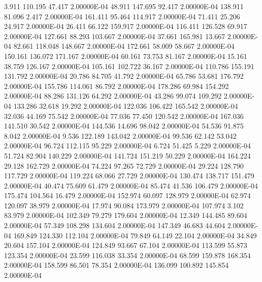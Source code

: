      3.911   110.195    47.417  2.00000E-04
    48.911   147.695    92.417  2.00000E-04
   138.911    81.096     2.417  2.00000E-04
   161.411    95.464   114.917  2.00000E-04
    71.411    25.206    24.917  2.00000E-04
    26.411    66.122   159.917  2.00000E-04
   116.411   126.528    69.917  2.00000E-04
   127.661    88.293   103.667  2.00000E-04
    37.661   165.981    13.667  2.00000E-04
    82.661   118.048   148.667  2.00000E-04
   172.661    58.009    58.667  2.00000E-04
   150.161   136.072   171.167  2.00000E-04
    60.161    73.753    81.167  2.00000E-04
    15.161    38.759   126.167  2.00000E-04
   105.161   102.722    36.167  2.00000E-04
   110.786   155.191   131.792  2.00000E-04
    20.786    84.705    41.792  2.00000E-04
    65.786    53.681   176.792  2.00000E-04
   155.786   114.061    86.792  2.00000E-04
   178.286    69.984   154.292  2.00000E-04
    88.286   131.126    64.292  2.00000E-04
    43.286    99.074   109.292  2.00000E-04
   133.286    32.618    19.292  2.00000E-04
   122.036   106.422   165.542  2.00000E-04
    32.036    44.169    75.542  2.00000E-04
    77.036    77.450   120.542  2.00000E-04
   167.036   141.510    30.542  2.00000E-04
   144.536    14.696    98.042  2.00000E-04
    54.536    91.875     8.042  2.00000E-04
     9.536   122.189   143.042  2.00000E-04
    99.536    62.142    53.042  2.00000E-04
    96.724   112.115    95.229  2.00000E-04
     6.724    51.425     5.229  2.00000E-04
    51.724    82.904   140.229  2.00000E-04
   141.724   151.219    50.229  2.00000E-04
   164.224    29.128   162.729  2.00000E-04
    74.224    97.265    72.729  2.00000E-04
    29.224   128.790   117.729  2.00000E-04
   119.224    68.066    27.729  2.00000E-04
   130.474   138.717   151.479  2.00000E-04
    40.474    75.609    61.479  2.00000E-04
    85.474    41.536   106.479  2.00000E-04
   175.474   104.564    16.479  2.00000E-04
   152.974    60.097   128.979  2.00000E-04
    62.974   120.097    38.979  2.00000E-04
    17.974    90.084   173.979  2.00000E-04
   107.974     3.102    83.979  2.00000E-04
   102.349    79.279   179.604  2.00000E-04
    12.349   144.485    89.604  2.00000E-04
    57.349   108.298   134.604  2.00000E-04
   147.349    46.683    44.604  2.00000E-04
   169.849   124.330   112.104  2.00000E-04
    79.849    64.149    22.104  2.00000E-04
    34.849    20.604   157.104  2.00000E-04
   124.849    93.667    67.104  2.00000E-04
   113.599    55.873   123.354  2.00000E-04
    23.599   116.038    33.354  2.00000E-04
    68.599   159.878   168.354  2.00000E-04
   158.599    86.501    78.354  2.00000E-04
   136.099   100.892   145.854  2.00000E-04
